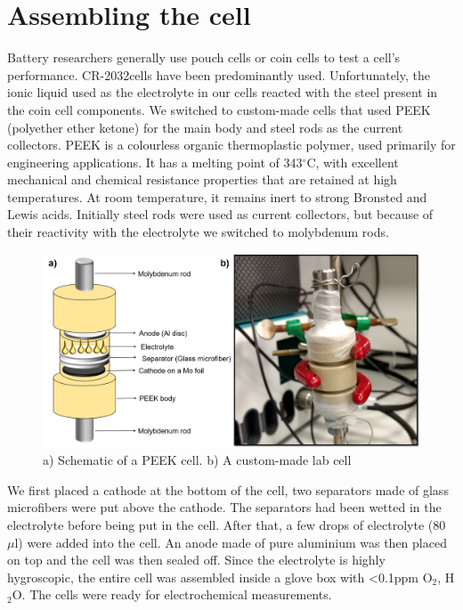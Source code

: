 \section{Assembling the cell}
Battery researchers generally use pouch cells or coin cells to test a cell's performance. CR-2032\textregistered  cells have been predominantly used. Unfortunately, the ionic liquid used as the electrolyte in our cells reacted with the steel present in the coin cell components. We switched to custom-made cells that used PEEK (polyether ether ketone) for the main body and steel rods as the current collectors. PEEK  is a colourless organic thermoplastic polymer, used primarily for engineering applications. It has a melting point of 343$^{\circ}$C,  with excellent mechanical and chemical resistance properties that are retained at high temperatures. At room temperature, it remains inert to strong Bronsted and Lewis acids. Initially steel rods were used as current collectors, but because of their reactivity with the electrolyte we switched to molybdenum rods. 
\begin{figure}[h!]
\centering
\includegraphics[width=\textwidth]{Figures/swagelok}
\caption{a) Schematic of a PEEK cell. b) A custom-made lab cell}
\end{figure}
We first placed a cathode at the bottom of the cell, two separators made of glass microfibers were put above the cathode. The separators had been wetted in the electrolyte before being put in the cell. After that, a few drops of electrolyte (80 $\mu$l) were added into the cell. An anode made of pure aluminium was then placed on top and the cell was then sealed off. Since the electrolyte is highly hygroscopic, the entire cell was assembled inside a glove box with <0.1ppm O$_2$, H$_2$O.
The cells were ready for electrochemical measurements. 





















